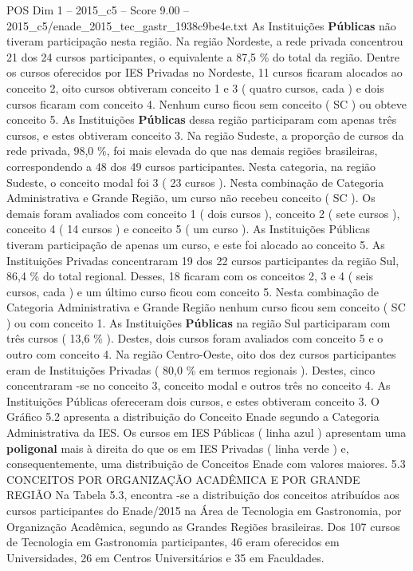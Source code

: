 \begin{textsample}{POS Dim 1 – 2015\_c5 – Score 9.00 – 2015\_c5/enade\_2015\_tec\_gastr\_1938c9be4e.txt}
As Instituições \textbf{Públicas} não tiveram participação nesta região.
Na região Nordeste, a rede privada concentrou 21 dos 24 cursos participantes, o equivalente a 87,5 \% do total da região.
Dentre os cursos oferecidos por IES Privadas no Nordeste, 11 cursos ficaram alocados ao conceito 2, oito cursos obtiveram conceito 1 e 3 ( quatro cursos, cada ) e dois cursos ficaram com conceito 4.
Nenhum curso ficou sem conceito ( SC ) ou obteve conceito 5.
As Instituições \textbf{Públicas} dessa região participaram com apenas três cursos, e estes obtiveram conceito 3.
Na região Sudeste, a proporção de cursos da rede privada, 98,0 \%, foi mais elevada do que nas demais regiões brasileiras, correspondendo a 48 dos 49 cursos participantes.
Nesta categoria, na região Sudeste, o conceito modal foi 3 ( 23 cursos ).
Nesta combinação de Categoria Administrativa e Grande Região, um curso não recebeu conceito ( SC ).
Os demais foram avaliados com conceito 1 ( dois cursos ), conceito 2 ( sete cursos ), conceito 4 ( 14 cursos ) e conceito 5 ( um curso ).
As Instituições Públicas tiveram participação de apenas um curso, e este foi alocado ao conceito 5.
As Instituições Privadas concentraram 19 dos 22 cursos participantes da região Sul, 86,4 \% do total regional.
Desses, 18 ficaram com os conceitos 2, 3 e 4 ( seis cursos, cada ) e um último curso ficou com conceito 5.
Nesta combinação de Categoria Administrativa e Grande Região nenhum curso ficou sem conceito ( SC ) ou com conceito 1.
As Instituições \textbf{Públicas} na região Sul participaram com três cursos ( 13,6 \% ).
Destes, dois cursos foram avaliados com conceito 5 e o outro com conceito 4.
Na região Centro-Oeste, oito dos dez cursos participantes eram de Instituições Privadas ( 80,0 \% em termos regionais ).
Destes, cinco concentraram -se no conceito 3, conceito modal e outros três no conceito 4.
As Instituições Públicas ofereceram dois cursos, e estes obtiveram conceito 3.
O Gráfico 5.2 apresenta a distribuição do Conceito Enade segundo a Categoria Administrativa da IES.
Os cursos em IES Públicas ( linha azul ) apresentam uma \textbf{poligonal} mais à direita do que os em IES Privadas ( linha verde ) e, consequentemente, uma distribuição de Conceitos Enade com valores maiores. 5.3 CONCEITOS POR ORGANIZAÇÃO ACADÊMICA E POR GRANDE REGIÃO Na Tabela 5.3, encontra -se a distribuição dos conceitos atribuídos aos cursos participantes do Enade/2015 na Área de Tecnologia em Gastronomia, por Organização Acadêmica, segundo as Grandes Regiões brasileiras.
Dos 107 cursos de Tecnologia em Gastronomia participantes, 46 eram oferecidos em Universidades, 26 em Centros Universitários e 35 em Faculdades.

\end{textsample}
